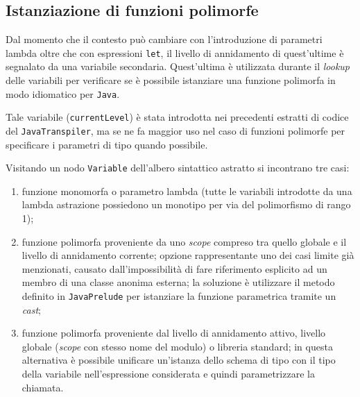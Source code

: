 \subsection{Istanziazione di funzioni polimorfe}
\label{sec:5-14-polymorphic-functions-instantiation}

Dal momento che il contesto può cambiare con l'introduzione di parametri lambda oltre che con espressioni \texttt{let},
il livello di annidamento di quest'ultime è segnalato da una variabile secondaria.
Quest'ultima è utilizzata durante il \textit{lookup}
delle variabili per verificare se è possibile istanziare una funzione polimorfa in modo idiomatico per \texttt{Java}.


Tale variabile (\texttt{currentLevel}) è stata introdotta nei precedenti estratti di codice del \texttt{JavaTranspiler},
ma se ne fa maggior uso nel caso di funzioni polimorfe per specificare i parametri di tipo quando possibile.

\noindent Visitando un nodo \texttt{Variable} dell'albero sintattico astratto si incontrano tre casi:
\begin{enumerate}
    \item funzione monomorfa o parametro lambda (tutte le variabili introdotte da una lambda astrazione
          possiedono un monotipo per via del polimorfismo di rango 1);
    \item funzione polimorfa proveniente da uno \textit{scope} compreso tra quello globale e il livello di annidamento corrente;
          opzione rappresentante uno dei casi limite già menzionati, causato dall'impossibilità di fare riferimento
          esplicito ad un membro di una classe anonima esterna; la soluzione è utilizzare il metodo definito in \texttt{JavaPrelude}
          per istanziare la funzione parametrica tramite un \textit{cast};
    \item funzione polimorfa proveniente dal livello di annidamento attivo, livello globale
          (\textit{scope} con stesso nome del modulo) o libreria standard; in questa alternativa è possibile unificare un'istanza
          dello schema di tipo con il tipo della variabile nell'espressione considerata e quindi parametrizzare la chiamata.
\end{enumerate}

\newpage


